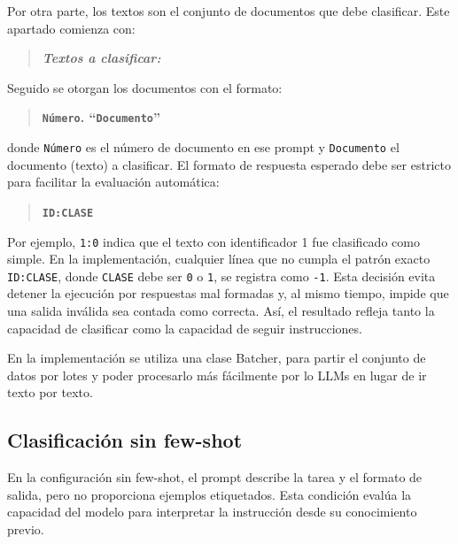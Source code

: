 \documentclass[12pt]{article}
\begin{document}
Por otra parte, los textos son el conjunto de documentos que debe clasificar. Este apartado comienza con:

\begin{quotation}
\textbf{\textit{Textos a clasificar:}}
\end{quotation}

Seguido se otorgan los documentos con el formato:

\begin{quotation}
\textbf{\texttt{Número}. ``\texttt{Documento}''}
\end{quotation}

donde \texttt{Número} es el número de documento en ese prompt y \texttt{Documento} el documento (texto) a clasificar. El formato de respuesta esperado debe ser estricto para facilitar la evaluación automática:

\begin{quotation}
\textbf{\texttt{ID:CLASE}}
\end{quotation}

Por ejemplo, \texttt{1:0} indica que el texto con identificador 1 fue clasificado como simple. En la implementación, cualquier línea que no cumpla el patrón exacto \texttt{ID:CLASE}, donde \texttt{CLASE} debe ser \texttt{0} o \texttt{1}, se registra como \texttt{-1}. Esta decisión evita detener la ejecución por respuestas mal formadas y, al mismo tiempo, impide que una salida inválida sea contada como correcta. Así, el resultado refleja tanto la capacidad de clasificar como la capacidad de seguir instrucciones.

En la implementación se utiliza una clase Batcher, para partir el conjunto de datos por lotes y poder procesarlo más fácilmente por lo LLMs en lugar de ir texto por texto.

\subsection{Clasificación sin few-shot}

En la configuración sin few-shot, el prompt describe la tarea y el formato de salida, pero no proporciona ejemplos etiquetados. Esta condición evalúa la capacidad del modelo para interpretar la instrucción desde su conocimiento previo.
\end{document}
